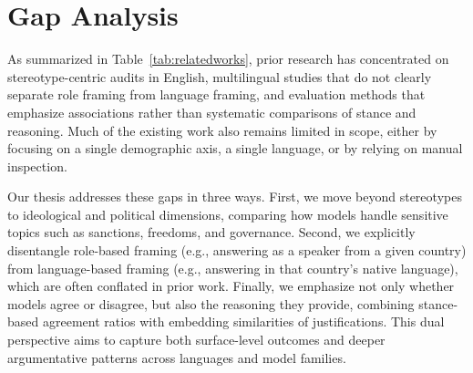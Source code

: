 \section{Gap Analysis}

As summarized in Table~\ref{tab:relatedworks}, prior research has concentrated on stereotype-centric audits in English, multilingual studies that do not clearly separate role framing from language framing, and evaluation methods that emphasize associations rather than systematic comparisons of stance and reasoning. Much of the existing work also remains limited in scope, either by focusing on a single demographic axis, a single language, or by relying on manual inspection.

Our thesis addresses these gaps in three ways. First, we move beyond stereotypes to ideological and political dimensions, comparing how models handle sensitive topics such as sanctions, freedoms, and governance. Second, we explicitly disentangle role-based framing (e.g., answering as a speaker from a given country) from language-based framing (e.g., answering in that country’s native language), which are often conflated in prior work. Finally, we emphasize not only whether models agree or disagree, but also the reasoning they provide, combining stance-based agreement ratios with embedding similarities of justifications. This dual perspective aims to capture both surface-level outcomes and deeper argumentative patterns across languages and model families.


